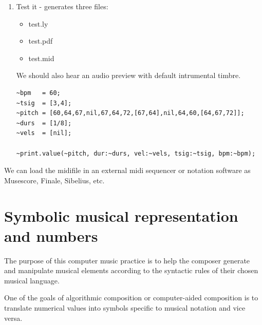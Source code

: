 \begin{enumerate}
\begin{lstlisting}[frame=single]
            seq = Pbind(
                      \midinote, Pseq(pitch.replace([nil],\rest),
                                      if(dur.size>pitch.size){inf}{1}),
                      \dur,      Pseq(dur * tsig[1],
                                      if(dur.size>pitch.size){1}{inf}),
                      \amp,      Pseq((vel.replace([nil],100)/127)**2,inf),
                        );
            ~midi = SimpleMIDIFile.new( filepath++'.mid' ); 
            ~midi.init;                  
            ~midi.init0(bpm,tsig[0].asString++"/"++tsig[1].asString);
            ~midi.timeMode = \ticks;   
            ~midi.fromPattern(seq);
            ~midi.checkWrite(filepath++'.mid', true); 
            1.wait;
            ~midi.play(TempoClock(bpm/60));
          }).play;  
        };
\end{lstlisting}

\item Test it - generates three files:

\begin{itemize}
\tightlist
\item test.ly
\item test.pdf
\item test.mid
\end{itemize}

We should also hear an audio preview with default intrumental timbre.

\begin{lstlisting}[frame=single] 
~bpm   = 60;
~tsig  = [3,4];
~pitch = [60,64,67,nil,67,64,72,[67,64],nil,64,60,[64,67,72]];
~durs  = [1/8];
~vels  = [nil];

~print.value(~pitch, dur:~durs, vel:~vels, tsig:~tsig, bpm:~bpm);
\end{lstlisting}
\end{enumerate}

We can load the midifile in an external midi sequencer or notation software as Musescore, Finale, Sibelius, etc.

\section{Symbolic musical representation and numbers}\label{symbolic-musical-representation-and-numbers}

The purpose of this computer music practice is to help the composer generate and manipulate musical elements according to the syntactic rules of their chosen musical language.

One of the goals of algorithmic composition or computer-aided composition is to translate numerical values \hspace{0pt}\hspace{0pt}into symbols specific to musical notation and vice versa.

